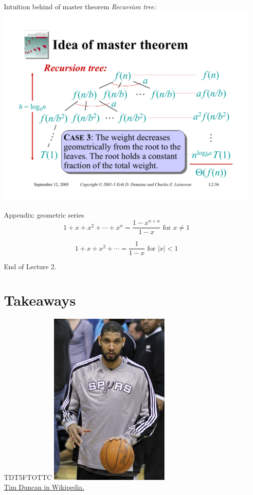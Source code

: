 \documentclass{beamer}
\begin{document}
\begin{frame}{Intuition behind of master theorem}
    \textit{Recursion tree:}\\
    \vspace{5mm}
    \includegraphics[width=\textwidth, trim={1.10cm 1.20cm 0.30cm 5.50cm}, clip]{pages/lec2_56}
\end{frame}

\begin{frame}{Appendix: geometric series}
    $$
        1 + x + x^2 + \cdots + x^n = \frac{1 - x^{n + a}}{1 - x} \text{ for } x \neq 1
    $$
    
    $$
        1 + x + x^2 + \cdots = \frac{1}{1 - x} \text{ for } |x| < 1
    $$
\end{frame}

\begin{frame}{}
    \centering
    \Huge End of Lecture 2.
\end{frame}

\section*{Takeaways}

\begin{frame}{TDT5FTOTTC}
    \centering
    \includegraphics[width=0.45\textwidth]{figures/td.jpg}\\
    \href{https://en.wikipedia.org/wiki/Tim_Duncan}{Tim Duncan in Wikipedia.}
\end{frame}
\end{document}
